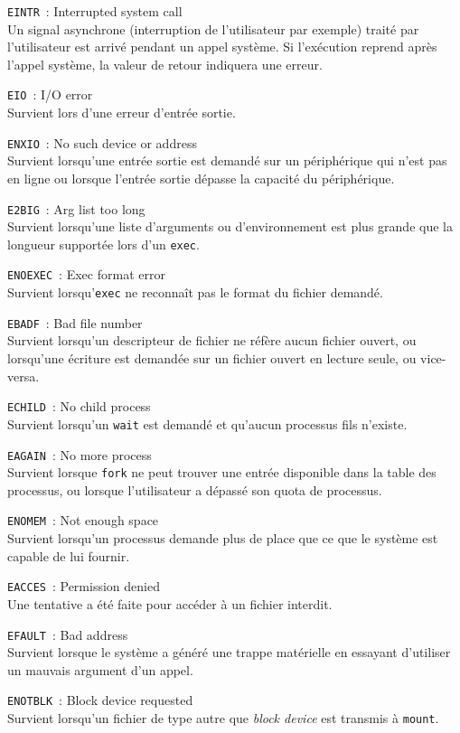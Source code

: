 \documentclass [twoside] {report}
\begin{document}
{\tt EINTR}~: Interrupted system call \\
Un signal asynchrone (interruption de
l'utilisateur par exemple) traité par
l'utilisateur est arrivé pendant un appel système.
Si l'exécution reprend après l'appel système, la
valeur de retour indiquera une erreur.

{\tt EIO}~: I/O error \\
Survient lors d'une erreur d'entrée sortie.

{\tt ENXIO}~: No such device or address \\
Survient lorsqu'une entrée sortie est demandé sur
un périphérique qui n'est pas en ligne ou lorsque
l'entrée sortie dépasse la capacité du
périphérique.

{\tt E2BIG}~: Arg list too long \\
Survient lorsqu'une liste d'arguments ou
d'environnement est plus grande que la longueur
supportée lors d'un {\tt exec}.

{\tt ENOEXEC}~: Exec format error \\
Survient lorsqu'{\tt exec} ne reconnaît pas le
format du fichier demandé.

{\tt EBADF}~: Bad file number \\
Survient lorsqu'un descripteur de fichier ne
réfère aucun fichier ouvert, ou lorsqu'une
écriture est demandée sur un fichier ouvert en
lecture seule, ou vice-versa.

{\tt ECHILD}~: No child process \\
Survient lorsqu'un {\tt wait} est demandé et
qu'aucun processus fils n'existe.

{\tt EAGAIN}~: No more process \\
Survient lorsque {\tt fork} ne peut trouver une
entrée disponible dans la table des processus, ou
lorsque l'utilisateur a dépassé son quota de
processus.

{\tt ENOMEM}~: Not enough space \\
Survient lorsqu'un processus demande plus de
place que ce que le système est capable de lui
fournir.

{\tt EACCES}~: Permission denied \\
Une tentative a été faite pour accéder à un
fichier interdit.

{\tt EFAULT}~: Bad address \\
Survient lorsque le système a généré une trappe matérielle en
essayant d'utiliser un mauvais argument d'un
appel.

{\tt ENOTBLK}~: Block device requested \\
Survient lorsqu'un fichier de type autre que
{\it block device} est transmis à {\tt mount}.
\end{document}

